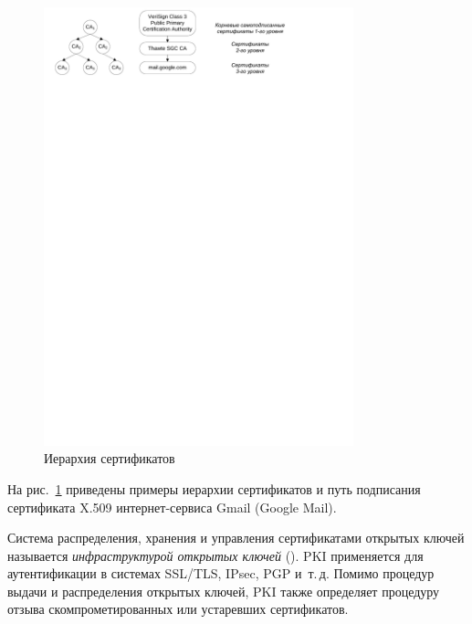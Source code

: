 \begin{figure}[!ht]
	\centering
	\includegraphics[width=0.8\textwidth]{pic/X509-hierarchy}
	\caption{Иерархия сертификатов\label{fig:x509-hierarchy}}
\end{figure}

На рис.~\ref{fig:x509-hierarchy} приведены примеры иерархии сертификатов и путь подписания сертификата X.509 интернет-сервиса Gmail (Google Mail).

Система распределения, хранения и управления сертификатами открытых ключей называется \emph{инфраструктурой открытых ключей} (). PKI применяется для аутентификации в системах SSL/TLS, IPsec, PGP и~т.\,д. Помимо процедур выдачи и распределения открытых ключей, PKI также определяет процедуру отзыва скомпрометированных или устаревших сертификатов.
